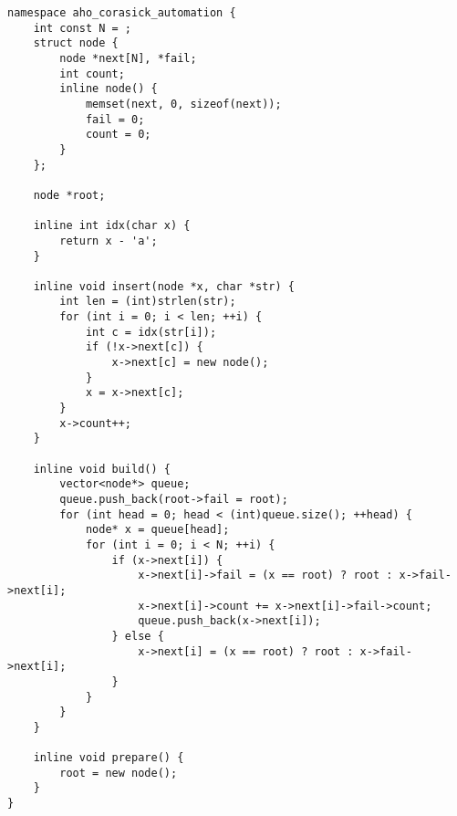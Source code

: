 \begin{lstlisting}
namespace aho_corasick_automation {
	int const N = ;
	struct node {
		node *next[N], *fail;
		int count;
		inline node() {
			memset(next, 0, sizeof(next));
			fail = 0;
			count = 0;
		}
	};
	
	node *root;
	
	inline int idx(char x) {
		return x - 'a';
	}
	
	inline void insert(node *x, char *str) {
		int len = (int)strlen(str);
		for (int i = 0; i < len; ++i) {
			int c = idx(str[i]);
			if (!x->next[c]) {
				x->next[c] = new node();
			}
			x = x->next[c];
		}
		x->count++;
	}
	
	inline void build() {
		vector<node*> queue;
		queue.push_back(root->fail = root);
		for (int head = 0; head < (int)queue.size(); ++head) {
			node* x = queue[head];
			for (int i = 0; i < N; ++i) {
				if (x->next[i]) {
					x->next[i]->fail = (x == root) ? root : x->fail->next[i];
					x->next[i]->count += x->next[i]->fail->count;
					queue.push_back(x->next[i]);
				} else {
					x->next[i] = (x == root) ? root : x->fail->next[i];
				}
			}
		}
	}
	
	inline void prepare() {
		root = new node();
	}
}
\end{lstlisting}
